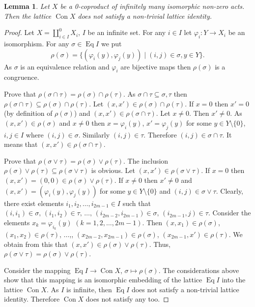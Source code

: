 \documentclass{birkau}
\numberwithin{equation}{section}
\theoremstyle{plain}
\newtheorem{lemma}[theorem]{Lemma}
\theoremstyle{definition}
\DeclareMathOperator{\Con}{Con}
\DeclareMathOperator{\Eq}{Eq}
\begin{document}
	\begin{lemma} \label{lemma:456}
	    Let $X$ be a 0-coproduct of infinitely many isomorphic non-zero acts. Then the lattice $\Con X$ does not satisfy a non-trivial lattice identity.
	\end{lemma}
	\begin{proof}
	    Let $X=\coprod_{i\in I}^0X_i$, $I$ be an infinite set. For any $i \in I$ let $\varphi_i: Y\to X_i$ be an isomorphism. For any $\sigma \in \Eq I$ we put $$ \rho(\sigma)= \{ (\varphi_i(y), \varphi_j(y)) \mid (i,j)\in \sigma, y\in Y \}. $$ As $\sigma$ is an equivalence relation and $\varphi_i$ are bijective maps then $\rho(\sigma)$ is a congruence.

        Prove that $\rho(\sigma \cap \tau) = \rho(\sigma) \cap \rho(\tau)$. As $\sigma \cap \tau \subseteq \sigma, \tau$ then $\rho(\sigma \cap \tau) \subseteq \rho(\sigma) \cap \rho(\tau)$. Let $ (x, x') \in \rho(\sigma) \cap \rho(\tau)$. If $x=0$ then $x'=0$ (by definition of $\rho(\sigma)$) and $ (x, x') \in \rho(\sigma \cap \tau)$. Let $x \ne 0$. Then $x' \ne 0$. As $ (x, x') \in \rho(\sigma)$ and $x \ne 0$ then $x=\varphi_i(y)$, $x'=\varphi_j(y)$ for some $y\in Y \setminus \{0\}$, $i,j \in I$ where $(i, j) \in \sigma$. Similarly $(i, j) \in \tau$. Therefore $(i, j)\in \sigma \cap \tau$. It means that $(x, x') \in \rho(\sigma \cap \tau)$.

        Prove that $\rho(\sigma \vee \tau) = \rho(\sigma) \vee \rho(\tau)$.  The inclusion  $\rho(\sigma) \vee \rho(\tau) \subseteq \rho(\sigma \vee \tau)$ is obvious. Let $(x, x') \in \rho(\sigma \vee \tau)$. If $x=0$ then $(x, x') = (0,0) \in \rho(\sigma) \vee \rho(\tau)$. If $x \ne 0$ then $x' \ne 0$ and $(x, x') =(\varphi_i(y), \varphi_j(y))$ for some $y\in Y \setminus \{ 0\}$ and $(i, j) \in \sigma \vee \tau$. Clearly, there exist elements $i_1, i_2, \ldots, i_{2m-1} \in I$ such that $(i, i_1) \in \sigma, \,(i_1, i_2) \in \tau, \, \ldots, \, (i_{2m-2}, i_{2m-1}) \in \sigma, \, (i_{2m-1}, j) \in \tau$. Consider the elements $x_k=\varphi_{i_k}(y)$ $(k=1,2, \ldots, 2m-1)$. Then $(x, x_1) \in \rho(\sigma)$, $(x_1, x_2) \in \rho(\tau)$, $\ldots$,, $(x_{2m-2}, x_{2m-1}) \in \rho(\sigma)$, $(x_{2m-1}, x') \in \rho(\tau)$. We obtain from this that $(x, x') \in \rho(\sigma) \vee \rho(\tau)$. Thus, $\rho(\sigma \vee \tau) = \rho(\sigma) \vee \rho(\tau)$.

        Consider the mapping $\Eq I \to \Con X$, $\sigma \mapsto \rho(\sigma)$. The considerations above show that this mapping is an isomorphic embedding of the lattice $\Eq I$ into the lattice $\Con X$. As $I$ is infinite, then $\Eq I$ does not satisfy a non-trivial lattice identity. Therefore $\Con X$ does not satisfy any too.
	\end{proof}
	
\end{document}
